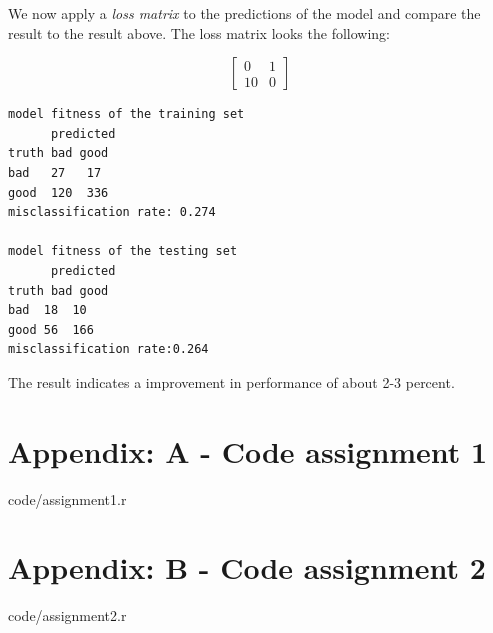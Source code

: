 \documentclass[a4paper,12pt]{article}
\begin{document}
We now apply a \textit{loss matrix} to the predictions of the model and compare the result to the result above. The loss matrix looks the following:

\begin{equation}
  \begin{bmatrix}
  0 & 1\\ 
  10 & 0
  \end{bmatrix}
\end{equation}

\begin{verbatim}
model fitness of the training set
      predicted
truth bad good
bad   27   17
good  120  336
misclassification rate: 0.274

model fitness of the testing set
      predicted
truth bad good
bad  18  10
good 56  166
misclassification rate:0.264
\end{verbatim}
The result indicates a improvement in performance of about 2-3 percent.

\section{Appendix: A - Code assignment 1}


    {code/assignment1.r}

\section{Appendix: B - Code assignment 2}


    {code/assignment2.r}
\end{document}
